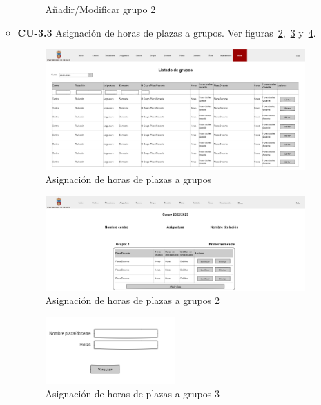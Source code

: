 \begin{itemize}
\begin{itemize}
\begin{figure}[!h]
		\caption{Añadir/Modificar grupo 2}\label{F-CU3.2.1(1)}
		\end{figure}
		\FloatBarrier
		\newpage
		\item \textbf{CU-3.3} Asignación de horas de plazas a grupos. Ver figuras~\ref{F-CU3.3},~\ref{F-CU3.3(1)} y~\ref{F-CU3.3(2)}. 
		\begin{figure}[!h]
		\centering
		\includegraphics[width=\textwidth]{../img/Anexos/Vistas/horas.png}
		\caption{Asignación de horas de plazas a grupos}\label{F-CU3.3}
		\end{figure}
		\FloatBarrier
		\begin{figure}[!h]
		\centering
		\includegraphics[width=\textwidth]{../img/Anexos/Vistas/asig_horas_plaza_grupo.png}
		\caption{Asignación de horas de plazas a grupos 2}\label{F-CU3.3(1)}
		\end{figure}
		\FloatBarrier
		\begin{figure}[!h]
		\centering
		\includegraphics[width=0.5\textwidth]{../img/Anexos/Vistas/asig_horas_plaza_grupo_modal.png}
		\caption{Asignación de horas de plazas a grupos 3}\label{F-CU3.3(2)}
		\end{figure}
		\FloatBarrier
	\end{itemize}
\end{itemize}



